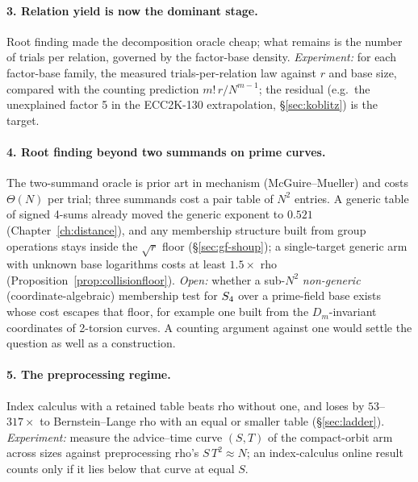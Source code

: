 \paragraph{3. Relation yield is now the dominant stage.} Root finding made
the decomposition oracle cheap; what remains is the number of trials per
relation, governed by the factor-base density. \emph{Experiment:} for each
factor-base family, the measured trials-per-relation law against $r$ and
base size, compared with the counting prediction $m!\,r/N^{m-1}$; the
residual (e.g.\ the unexplained factor 5 in the ECC2K-130 extrapolation,
\S\ref{sec:koblitz}) is the target.

\paragraph{4. Root finding beyond two summands on prime curves.} The
two-summand oracle is prior art in mechanism (McGuire--Mueller) and costs
$\Theta(N)$ per trial; three summands cost a pair table of $N^2$ entries.
A generic table of signed 4-sums already moved the generic exponent to
$0.521$ (Chapter~\ref{ch:distance}), and any membership structure built
from group operations stays inside the $\sqrt r$ floor
(\S\ref{sec:gf-shoup}); a single-target generic arm with unknown base
logarithms costs at least $1.5\times$ rho
(Proposition~\ref{prop:collisionfloor}). \emph{Open:} whether a
sub-$N^2$ \emph{non-generic} (coordinate-algebraic) membership test for
$S_{4}$ over a prime-field base exists whose cost escapes that floor, for
example one built from the $D_m$-invariant coordinates of 2-torsion
curves. A counting argument against one would settle the question as well
as a construction.

\paragraph{5. The preprocessing regime.} Index calculus with a retained
table beats rho without one, and loses by $53$--$317\times$ to
Bernstein--Lange rho with an equal or smaller table (\S\ref{sec:ladder}).
\emph{Experiment:} measure the advice--time curve $(S,T)$ of the
compact-orbit arm across sizes against preprocessing rho's
$S\,T^2\approx N$; an index-calculus online result counts only if it lies
below that curve at equal $S$.

